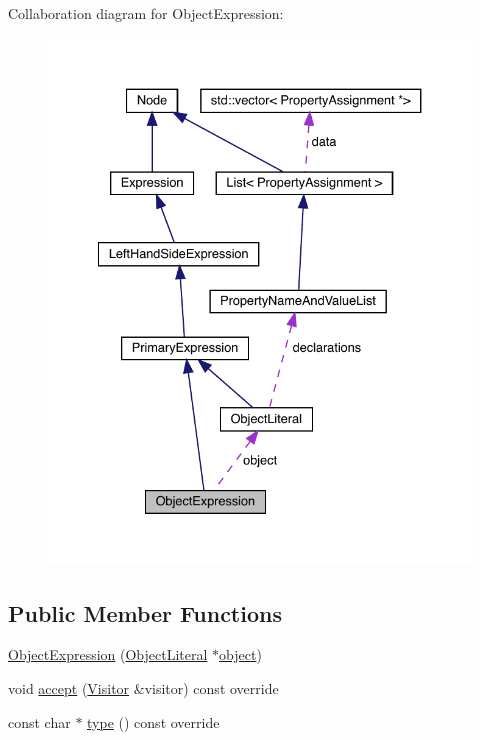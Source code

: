 Collaboration diagram for Object\+Expression\+:\nopagebreak
\begin{figure}[H]
\begin{center}
\leavevmode
\includegraphics[width=334pt]{struct_object_expression__coll__graph}
\end{center}
\end{figure}
\subsection*{Public Member Functions}
\begin{DoxyCompactItemize}
\item 
\hyperlink{struct_object_expression_a6fc7ddf18ed9892b85ba64d1d8e0a33b}{Object\+Expression} (\hyperlink{struct_object_literal}{Object\+Literal} $\ast$\hyperlink{struct_object_expression_abd6be2f4cbb70b2ca388d57270bbf17c}{object})
\item 
void \hyperlink{struct_object_expression_a360acff3bec82217a5adf58218aed49d}{accept} (\hyperlink{struct_visitor}{Visitor} \&visitor) const override
\item 
const char $\ast$ \hyperlink{struct_object_expression_ad232045e9914b06cfe8d7028ede2c365}{type} () const override
\end{DoxyCompactItemize}
